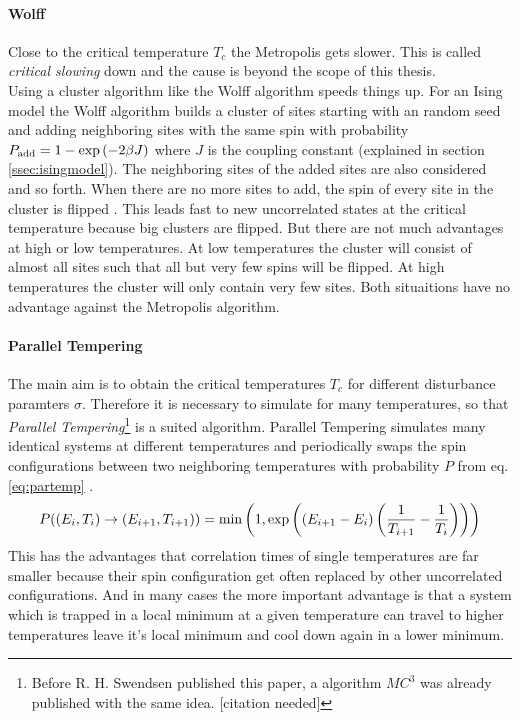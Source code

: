     \paragraph{Wolff}
        Close to the critical temperature \(T_c\) the Metropolis
        gets slower. This is called \emph{critical slowing} down and the
        cause is beyond the scope of this thesis.\\
        Using a cluster algorithm like the Wolff
        algorithm \cite{Wolff1989} speeds things up.
        For an Ising model the Wolff algorithm builds a cluster of sites
        starting with an random seed and adding neighboring sites with
        the same spin with probability
        \(P_{\mathrm{add}} = 1-\exp\left(-2\beta J\right)\)
        where \(J\) is the coupling constant (explained in section
        \ref{ssec:isingmodel}). The neighboring sites of the added sites
        are also considered and so forth. When there are no more sites
        to add, the spin of every site in the cluster is flipped
        \cite[S. ??]{NewmanBarkema1999} \cite[S. 151f]{Katzgraber2011}.
        This leads fast to new uncorrelated states at the critical
        temperature because big clusters are flipped. But there are not
        much advantages at high or low temperatures. At low temperatures
        the cluster will consist of almost all sites such that all but
        very few spins will be flipped. At high temperatures the cluster
        will only contain very few sites.
        Both situaitions have no advantage against the Metropolis algorithm.

    \paragraph{Parallel Tempering}
        The main aim is to obtain the critical temperatures
        \(T_c\) for different disturbance paramters \(\sigma\).
        Therefore it is necessary to simulate for many temperatures,
        so that \emph{Parallel Tempering}\footnote{Before R. H.
            Swendsen published this paper, a algorithm \(MC^3\) was
            already published with the same idea. [citation needed]}
        \cite{ParallelTempering1986} is a suited algorithm. Parallel
        Tempering simulates many identical systems at different
        temperatures and periodically swaps the spin configurations
        between two neighboring temperatures with probability \(P\) from
        eq. \ref{eq:partemp} \cite[S. ??]{NewmanBarkema1999} \cite[S. 155ff]{Katzgraber2011}.
        \begin{equation}
            P((E_i,T_i) \to (E_{i+1},T_{i+1})) = \min\left(1,\exp\left(\left(E_{i+1}-E_i\right)\left(\frac{1}{T_{i+1}}-\frac{1}{T_i}\right)\right)\right)
            \label{eq:partemp}
        \end{equation}
        This has the advantages that correlation times of single
        temperatures are far smaller because their spin configuration
        get often replaced by other uncorrelated configurations. And in
        many cases the more important advantage is that a system which
        is trapped in a local minimum at a given temperature can travel
        to higher temperatures leave it's local minimum and cool down
        again in a lower minimum.

